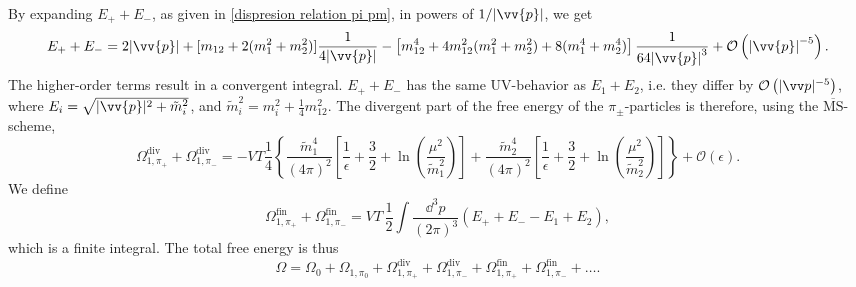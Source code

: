 By expanding $E_+ + E_-$, as given in \autoref{dispresion relation pi pm}, in powers of $1 / \abs{\vv{p}}$, we get 
\begin{equation}
    E_+ + E_-
    = 2  \abs{\vv{p}}
    + [m_{12} + 2(m_1^2 + m_2^2)]\frac{1}{4 \abs{\vv{p}}}
    - \left[ m_{12}^4 + 4 m_{12}^2(m_1^2 + m_2^2) + 8(m_1^4 + m_2^4) \right] \frac{1}{64 \abs{\vv{p}}^3}
    + \Oh[-5]{ \abs{\vv{p}}}.
\end{equation}
The higher-order terms result in a convergent integral.
$E_+ + E_-$ has the same UV-behavior as $E_1 + E_2$, i.e. they differ by  $\Oh[-5]{|\vv p|}$, where $E_i = \sqrt{|\vv{p}|^2 + \tilde m_i^2}$, and $\tilde m_i^2 = m_i^2 + \frac{1}{4} m_{12}^2$. 
The divergent part of the free energy of the $\pi_\pm$-particles is therefore, using the $\mathrm{\overline{MS}}$-scheme, 
\begin{equation}
    \Omega^{\mathrm{div}}_{1, \pi_+} + \Omega^{\mathrm{div}}_{1, \pi_-}
    = 
    - VT \frac{1}{4}
    \left\{
        \frac{\tilde m_1^4}{(4\pi)^2} 
        \left[
            \frac{1}{\epsilon} + \frac{3}{2} + \ln(\frac{\mu^2}{\tilde m_1^2}) 
        \right]
        +
        \frac{\tilde m_2^4}{(4\pi)^2} 
        \left[
            \frac{1}{\epsilon} + \frac{3}{2} + \ln(\frac{\mu^2}{\tilde m_2^2})
        \right] 
    \right\} 
    + \mathcal{O}(\epsilon).
\end{equation}
We define
\begin{equation}
    \Omega^{\mathrm{fin}}_{1, \pi_+} + \Omega^{\mathrm{fin}}_{1, \pi_-}
    = 
    V T \, \frac{1}{2} \int \frac{\dd^3 p}{(2\pi)^3} (E_+ + E_- - E_1 + E_2),
\end{equation}
which is a finite integral.
The total free energy is thus
\begin{equation}
    \Omega = \Omega_0 
    + \Omega_{1, \pi_0} 
    + \Omega^{\mathrm{div}}_{1, \pi_+} + \Omega^{\mathrm{div}}_{1, \pi_-}
    + \Omega^{\mathrm{fin}}_{1, \pi_+} + \Omega^{\mathrm{fin}}_{1, \pi_-}
    + \dots.
\end{equation}
